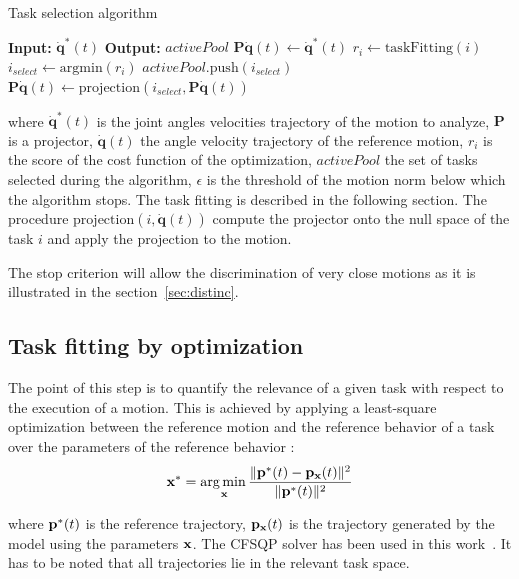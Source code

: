 \documentclass[letterpaper, 10pt, conference]{ieeeconf}      %
\begin{document}
\newcommand{\shOUTPUT}{\textbf{Output: }}
\newcommand{\shINPUT}{\textbf{Input: }}

\begin{algorithm}
  \caption{Task selection algorithm}
  \label{alg:taskSelection}
\begin{algorithmic}[1]
  \STATE \shINPUT $\mathbf{\dot{q}}^{*}(t)$
\STATE \shOUTPUT $activePool$
\STATE $\mathbf{P}\mathbf{\dot{q}}(t)\gets \mathbf{\dot{q}}^{*}(t)$
    \STATE $r_i \gets \mathrm{taskFitting}(i)$
  \ENDFOR
  \STATE $i_{select} \gets \mathrm{argmin}(r_i)$
  \STATE $activePool.\mathrm{push}(i_{select})$
  \STATE $\mathbf{P}\mathbf{\dot{q}}(t) \gets \mathrm{projection}(i_{select}, \mathbf{P}\mathbf{\dot{q}}(t))$
\ENDWHILE
\end{algorithmic}
\end{algorithm}
where  $\mathbf{\dot{q}}^{*}(t)$ is the joint angles velocities trajectory of the motion to analyze,
$\mathbf{P}$ is a projector, $\mathbf{\dot{q}}(t)$ the angle velocity trajectory
of the reference motion, $r_i$ is the score of the cost function of the optimization, $activePool$
the set of tasks selected during the algorithm, $\epsilon$ is the threshold
of the motion norm below which the algorithm stops. The task fitting is described
in the following section. The procedure $\mathrm{projection}(i, \mathbf{\dot{q}}(t))$ compute the projector onto
the null space of the task $i$ and apply the projection to the motion.

The stop criterion will allow the discrimination of very close motions as it is illustrated in
the section~\ref{sec:distinc}.

\subsection{Task fitting by optimization} \label{sec:alg2:proj}
The point of this step is to quantify the relevance of a given task with respect to
the execution of a motion. This is achieved by applying a least-square optimization
between the reference motion and the reference behavior of a task over the parameters
of the reference behavior :
\begin{equation}
	{\mathbf{x}}^* = \underset{{\mathbf{x}}}{\operatorname*{arg\,min\,}} \frac{\Vert {\mathbf{p}}^*(t) - {\mathbf{p}}_{\mathbf{x}}(t) \Vert^2}{\Vert {\mathbf{p}}^*(t) \Vert^2}
\label{optimProblem}
\end{equation}

\noindent where ${\mathbf{p}}^*(t)$ is the reference trajectory, ${\mathbf{p}}_{\mathbf{x}}(t)$ is the trajectory
generated by the model using the parameters ${\mathbf{x}}$. The CFSQP solver has been used in this work~\cite{lawrence97}.
It has to be noted that all trajectories lie in the relevant task space.
\end{document}
